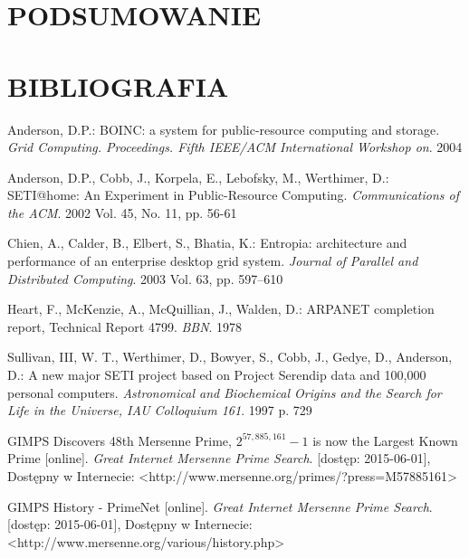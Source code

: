\documentclass[12pt,a4paper,twoside]{article}
\begin{document}
\section{PODSUMOWANIE}


\newpage

\section{BIBLIOGRAFIA}

\begingroup
\renewcommand{\section}[2]{}%
\begin{thebibliography}{99}

 Anderson, D.P.: BOINC: a system for public-resource computing and storage. \textit{Grid Computing. Proceedings. Fifth IEEE/ACM International Workshop on}. 2004

 Anderson, D.P., Cobb, J., Korpela, E., Lebofsky, M., Werthimer, D.: SETI@home: An Experiment in Public-Resource Computing. \textit{Communications of the ACM}. 2002 Vol. 45, No. 11, pp. 56-61

 Chien, A., Calder, B., Elbert, S., Bhatia, K.: Entropia: architecture and performance of an enterprise desktop grid system. \textit{Journal of Parallel and Distributed Computing}. 2003 Vol. 63, pp. 597–610

 Heart, F., McKenzie, A., McQuillian, J., Walden, D.: ARPANET completion report, Technical Report 4799. \textit{BBN}. 1978

 Sullivan, III, W. T., Werthimer, D., Bowyer, S., Cobb, J., Gedye, D., Anderson, D.: A new major SETI project based on Project Serendip data and 100,000 personal computers. \textit{Astronomical and Biochemical Origins and the Search for Life in the Universe, IAU Colloquium 161}. 1997 p. 729  


 GIMPS Discovers 48th Mersenne Prime, $2^{57,885,161}-1$ is now the Largest Known Prime [online].\textit{ Great Internet Mersenne Prime Search}. [dostęp: 2015-06-01], Dostępny w Internecie: <http://www.mersenne.org/primes/?press=M57885161>

 GIMPS History - PrimeNet [online].\textit{ Great Internet Mersenne Prime Search}. [dostęp: 2015-06-01], Dostępny w Internecie: <http://www.mersenne.org/various/history.php>


\end{thebibliography}
\end{document}

